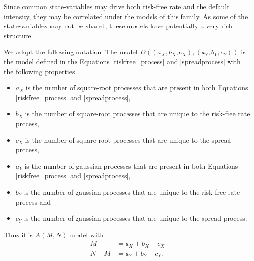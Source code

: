 Since common state-variables may drive both risk-free rate and the default intensity, they may be correlated under the models of this family. As some of the state-variables may not be shared, these models have potentially a very rich structure. 

We adopt the following notation. The model $D((a_X,b_X,c_X),(a_Y,b_Y,c_Y))$ is the model defined in the Equations \ref{riskfree_process} and \ref{spreadprocess} with the following properties
	\begin{itemize}
		\item $a_X$ is the number of square-root processes that are present in both Equations \ref{riskfree_process} and \ref{spreadprocess},
		\item $b_X$ is the number of square-root processes that are unique to the risk-free rate process,
		\item $c_X$ is the number of square-root processes that are unique to the spread process,
		\item $a_Y$ is the number of gaussian processes that are present in both Equations \ref{riskfree_process} and \ref{spreadprocess},
		\item $b_Y$ is the number of gaussian processes that are unique to the risk-free rate process and
		\item $c_Y$ is the number of gaussian processes that are unique to the spread process.
	\end{itemize}
Thus it is $A(M,N)$ model with
	\begin{align}
		M &= a_X + b_X + c_X \\
		N - M &= a_Y + b_Y + c_Y .
	\end{align}

